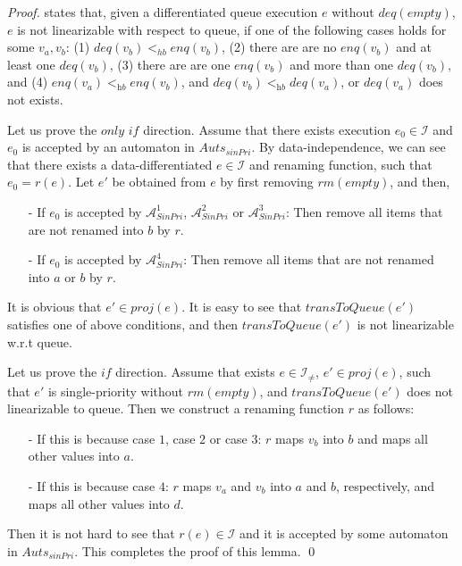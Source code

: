 \begin {proof}

\cite{Bouajjani:2015} states that, given a differentiated queue execution $e$ without $\textit{deq}(\textit{empty})$, $e$ is not linearizable with respect to queue, if one of the following cases holds for some $v_a,v_b$: (1) $\textit{deq}(v_b) <_{hb} \textit{enq}(v_b)$, (2) there are are no $\textit{enq}(v_b)$ and at least one $\textit{deq}(v_b)$, (3) there are are one $\textit{enq}(v_b)$ and more than one $\textit{deq}(v_b)$, and (4) $\textit{enq}(v_a) <_{\textit{hb}} \textit{enq}(v_b)$, and $\textit{deq}(v_b) <_{\textit{hb}} \textit{deq}(v_a)$, or $\textit{deq}(v_a)$ does not exists.

Let us prove the $\textit{only if}$ direction. Assume that there exists execution $e_0 \in \mathcal{I}$ and $e_0$ is accepted by an automaton in $\textit{Auts}_{\textit{sinPri}}$. By data-independence, we can see that there exists a data-differentiated $e \in \mathcal{I}$ and renaming function, such that $e_0=r(e)$. Let $e'$ be obtained from $e$ by first removing $\textit{rm}(\textit{empty})$, and then,

\begin{itemize}
\setlength{\itemsep}{0.5pt}
\item[-] If $e_0$ is accepted by $\mathcal{A}_{\textit{SinPri}}^1$, $\mathcal{A}_{\textit{SinPri}}^2$ or $\mathcal{A}_{\textit{SinPri}}^3$: Then remove all items that are not renamed into $b$ by $r$.

\item[-] If $e_0$ is accepted by $\mathcal{A}_{\textit{SinPri}}^4$: Then remove all items that are not renamed into $a$ or $b$ by $r$.
\end{itemize}

It is obvious that $e' \in \textit{proj}(e)$. It is easy to see that $\textit{transToQueue}(e')$ satisfies one of above conditions, and then $\textit{transToQueue}(e')$ is not linearizable w.r.t queue.

Let us prove the $\textit{if}$ direction. Assume that exists $e \in \mathcal{I}_{\neq}$, $e' \in \textit{proj}(e)$, such that $e'$ is single-priority  without $\textit{rm}(\textit{empty})$, and $\textit{transToQueue}(e')$ does not linearizable to queue. Then we construct a renaming function $r$ as follows:

\begin{itemize}
\setlength{\itemsep}{0.5pt}
\item[-] If this is because case $1$, case $2$ or case $3$: $r$ maps $v_b$ into $b$ and maps all other values into $a$.

\item[-] If this is because case $4$: $r$ maps $v_a$ and $v_b$ into $a$ and $b$, respectively, and maps all other values into $d$.
\end{itemize}

Then it is not hard to see that $r(e) \in \mathcal{I}$ and it is accepted by some automaton in $\textit{Auts}_{\textit{sinPri}}$. This completes the proof of this lemma. \qed
\end {proof}




